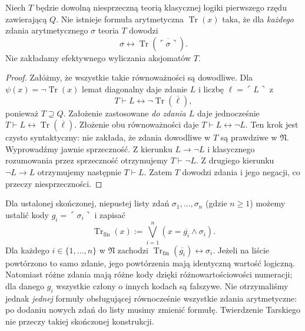 \begin{twierdzenie}\label{thm:tarski-syntactic}
Niech $T$ będzie dowolną niesprzeczną teorią
klasycznej logiki pierwszego rzędu zawierającą $Q$.
Nie istnieje formuła arytmetyczna $\operatorname{Tr}(x)$
taka, że dla \emph{każdego} zdania arytmetycznego
$\sigma$ teoria $T$ dowodzi
\[
\sigma\leftrightarrow
\operatorname{Tr}(\overline{\ulcorner\sigma\urcorner}).
\]
Nie zakładamy efektywnego wyliczania aksjomatów $T$.
\end{twierdzenie}
\begin{proof}
Załóżmy, że wszystkie takie równoważności są dowodliwe.
Dla $\psi(x)=\neg\operatorname{Tr}(x)$ lemat diagonalny
daje zdanie $L$ i liczbę $\ell=\ulcorner L\urcorner$ z
\[
T\vdash L\leftrightarrow\neg\operatorname{Tr}(\overline\ell),
\]
ponieważ $T\supseteq Q$. Założenie zastosowane
\emph{do zdania $L$} daje jednocześnie
$T\vdash L\leftrightarrow\operatorname{Tr}(\overline\ell)$.
Złożenie obu równoważności daje
$T\vdash L\leftrightarrow\neg L$.
Ten krok jest czysto syntaktyczny: nie zakłada, że zdania
dowodliwe w $T$ są prawdziwe w $\mathfrak N$.
Wyprowadźmy jawnie sprzeczność.
Z kierunku $L\to\neg L$ i klasycznego rozumowania
przez sprzeczność otrzymujemy $T\vdash\neg L$.
Z drugiego kierunku $\neg L\to L$ otrzymujemy następnie
$T\vdash L$. Zatem $T$ dowodzi zdania i jego negacji,
co przeczy niesprzeczności.
\end{proof}

\begin{przyklad}
Dla ustalonej skończonej, niepustej listy zdań
$\sigma_1,\ldots,\sigma_n$ (gdzie $n\ge1$)
możemy ustalić kody $g_i=\ulcorner\sigma_i\urcorner$ i zapisać
\[
\operatorname{Tr}_{\mathrm{fin}}(x):=
\bigvee_{i=1}^{n}(x=\overline{g_i}\land\sigma_i).
\]
Dla każdego $i\in\{1,\ldots,n\}$ w $\mathfrak N$ zachodzi
$\operatorname{Tr}_{\mathrm{fin}}(\overline{g_i})
\leftrightarrow\sigma_i$.
Jeżeli na liście powtórzono to samo zdanie, jego powtórzenia
mają identyczną wartość logiczną. Natomiast różne zdania
mają różne kody dzięki różnowartościowości numeracji;
dla danego $g_i$ wszystkie człony o innych kodach są fałszywe.
Nie otrzymaliśmy jednak \emph{jednej} formuły
obsługującej równocześnie wszystkie zdania arytmetyczne:
po dodaniu nowych zdań do listy musimy zmienić formułę.
Twierdzenie Tarskiego nie przeczy takiej skończonej konstrukcji.
\end{przyklad}

